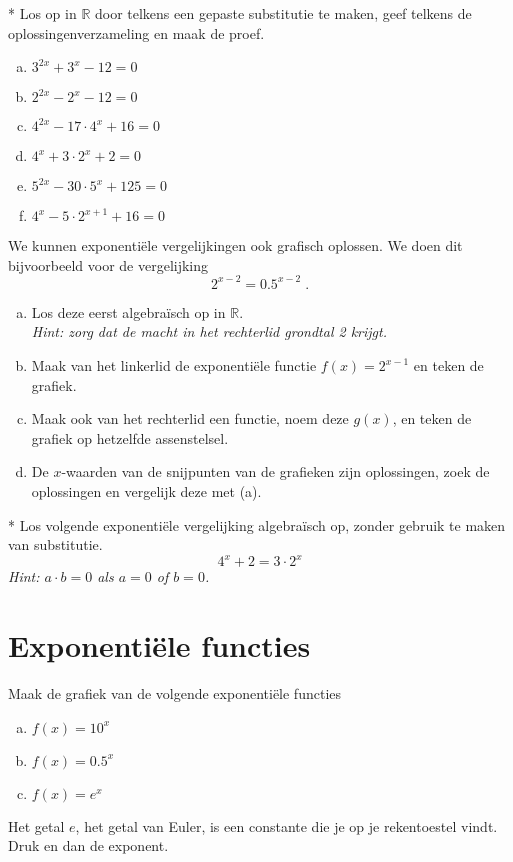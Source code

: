 \documentclass[12pt,twoside]{article}
\begin{document}
\begin{oefening}*
Los op in $\mathbb{R}$ door telkens een gepaste substitutie te maken, geef telkens de oplossingenverzameling en maak de proef.
\begin{multicols}{2}
\begin{enumerate}[(a)]
  \item $3^{2x}+3^x-12=0$
  \item $2^{2x}-2^x-12=0$
  \item $4^{2x}-17\cdot 4^x + 16=0$
  \item $4^x+3\cdot 2^x+2=0$
  \item $5^{2x}-30\cdot 5^x+125=0$
  \item $4^x-5\cdot 2^{x+1}+16=0$
\end{enumerate}
\end{multicols}
\end{oefening}

\begin{oefening}
We kunnen exponentiële vergelijkingen ook grafisch oplossen. We doen dit bijvoorbeeld voor de vergelijking
$$2^{x-2}=0.5^{x-2}\;.$$
\begin{enumerate}[(a)]
  \item Los deze eerst algebraïsch op in $\mathbb{R}$.\\
        {\em Hint: zorg dat de macht in het rechterlid grondtal 2 krijgt.}
  \item Maak van het linkerlid de exponentiële functie $f(x)=2^{x-1}$ en teken de grafiek.
  \item Maak ook van het rechterlid een functie, noem deze $g(x)$, en teken de grafiek op hetzelfde assenstelsel.
  \item De $x$-waarden van de snijpunten van de grafieken zijn oplossingen, zoek de oplossingen en vergelijk deze met (a).
\end{enumerate}
\end{oefening}

\begin{oefening}*
Los volgende exponentiële vergelijking algebraïsch op, zonder gebruik te maken van substitutie.
$$4^x+2=3\cdot2^x$$
{\em Hint: $a\cdot b=0$ als $a=0$ of $b=0$.}
\end{oefening}

\pagebreak
\section{Exponentiële functies}

\begin{oefening}
Maak de grafiek van de volgende exponentiële functies
\begin{multicols}{3}
\begin{enumerate}[(a)]
  \itemsep.5em
  \item $f(x)=10^x$
  \item $f(x)=0.5^x$
  \item $f(x)=e^x$
\end{enumerate}
\end{multicols}
Het getal $e$, het getal van Euler, is een constante die je op je rekentoestel vindt. Druk   en dan de exponent.
\end{oefening}
\end{document}
